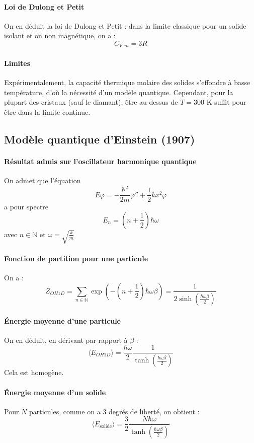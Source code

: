 \documentclass[french]{book}
\theoremstyle{plain}
\theoremstyle{definition}
\theoremstyle{remark}
\newcommand{\N}{\mathbb{N}}
\begin{document}
\paragraph{Loi de Dulong et Petit} On en déduit la loi de Dulong et Petit : dans la limite classique pour un solide isolant et on non magnétique, on a : $$C_{V,m}=3R$$

\paragraph{Limites} Expérimentalement, la capacité thermique molaire des solides s’effondre à basse température, d’où la nécessité d’un modèle quantique. Cependant, pour la plupart des cristaux (sauf le diamant), être au-dessus de $T=300$ K suffit pour être dans la limite continue.
\subsection{Modèle quantique d'Einstein (1907)}

\paragraph{Résultat admis sur l'oscillateur harmonique quantique} On admet que l'équation $$E\varphi=-\frac{\hbar^2}{2m}\varphi''+\frac{1}{2}kx^2\varphi$$ a pour spectre $$E_n=\left(n+\frac{1}{2}\right)\hbar\omega$$ avec $n\in\N$ et $\omega=\displaystyle\sqrt{\frac{k}{m}}$

\paragraph{Fonction de partition pour une particule} On a : $$Z_{OH1D}=\sum_{n\in\N}\exp\left(-\left(n+\frac{1}{2}\right)\hbar\omega\beta\right)=\frac{1}{2\sinh\left(\frac{\hbar\omega\beta}{2}\right)}$$

\paragraph{Énergie moyenne d'une particule} On en déduit, en dérivant par rapport à $\beta$ : $$\langle E_{OH1D}\rangle=\frac{\hbar\omega}{2}\frac{1}{\tanh\left(\frac{\hbar\omega\beta}{2}\right)}$$ Cela est homogène.

\paragraph{Énergie moyenne d'un solide} Pour $N$ particules, comme on a $3$ degrés de liberté, on obtient : $$\langle E_\text{solide}\rangle=\frac{3}{2}\frac{N\hbar\omega}{\tanh\left(\frac{\hbar\omega\beta}{2}\right)}$$
\end{document}

